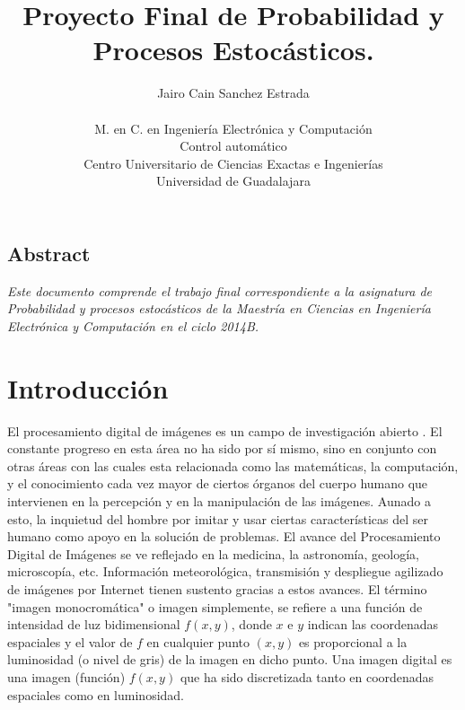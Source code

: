 \documentclass{article}
\begin{document}
\date{}

\title{\Large\bf Proyecto Final de Probabilidad y Procesos Estocásticos.}

\author{ Jairo Cain Sanchez Estrada \\ 
\\
  M. en C. en Ingeniería Electrónica y Computación\\
  Control automático \\ 
  Centro Universitario de Ciencias Exactas e Ingenierías\\
  Universidad de Guadalajara}

\maketitle
\thispagestyle{empty}

\subsection*{\centering Abstract}
\textit{Este documento comprende el trabajo final correspondiente a la asignatura de Probabilidad y procesos estocásticos de la Maestría en Ciencias en Ingeniería Electrónica y Computación en el ciclo 2014B.}

\section{Introducción}\label{sec:intro}
El procesamiento digital de imágenes es un campo de investigación abierto \cite{femat1999}. El constante progreso en esta área no ha sido por sí mismo, sino en conjunto con otras áreas con las cuales esta relacionada como las matemáticas, la computación, y el conocimiento cada vez mayor de ciertos órganos del cuerpo humano que intervienen en la percepción y en la manipulación de las imágenes. Aunado a esto, la inquietud del hombre por imitar y usar ciertas características del ser humano como apoyo en la solución de problemas. El avance del Procesamiento Digital de Imágenes se ve reflejado en la medicina, la astronomía, geología, microscopía, etc. Información meteorológica, transmisión y despliegue agilizado de imágenes por Internet tienen sustento gracias a estos avances.
El término "imagen monocromática" o imagen simplemente, se refiere a una función de intensidad de luz bidimensional $f(x,y)$, donde $x$ e $y$ indican las coordenadas espaciales y el valor de $f$ en cualquier punto $(x,y)$ es proporcional a la luminosidad (o nivel de gris) de la imagen en dicho punto.
Una imagen digital es una imagen (función) $f(x,y)$ que ha sido discretizada tanto en coordenadas espaciales como en luminosidad.
\end{document}
